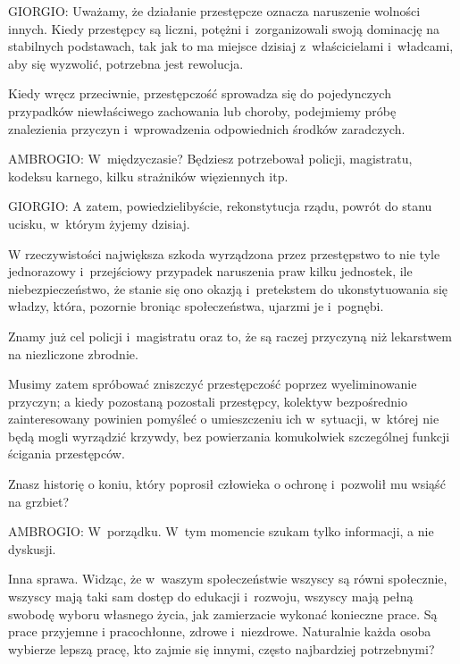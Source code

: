 \documentclass[oneside,polish,11pt,sfheadings]{mwbk}
\begin{document}
 
\noindent GIORGIO: Uważamy, że działanie przestępcze oznacza naruszenie wolności innych. Kiedy przestępcy są liczni, potężni i~zorganizowali swoją dominację na stabilnych podstawach, tak jak to ma miejsce dzisiaj z~właścicielami i~władcami, aby
się wyzwolić, potrzebna jest rewolucja. 

 
Kiedy wręcz przeciwnie, przestępczość sprowadza się do pojedynczych przypadków niewłaściwego zachowania lub choroby,
podejmiemy próbę znalezienia przyczyn i~wprowadzenia odpowiednich środków zaradczych. 




 
\noindent AMBROGIO: W~międzyczasie? Będziesz potrzebował policji, magistratu, kodeksu karnego, kilku strażników więziennych
itp. 




 
\noindent GIORGIO: A zatem, powiedzielibyście, rekonstytucja rządu, powrót do stanu ucisku, w~którym żyjemy dzisiaj. 

 
W rzeczywistości największa szkoda wyrządzona przez przestępstwo to nie tyle jednorazowy i~przejściowy przypadek
naruszenia praw kilku jednostek, ile niebezpieczeństwo, że stanie się ono okazją i~pretekstem do ukonstytuowania się
władzy, która, pozornie broniąc społeczeństwa, ujarzmi je i~pognębi. 

 
Znamy już cel policji i~magistratu oraz to, że są raczej przyczyną niż lekarstwem na niezliczone zbrodnie. 

 
Musimy zatem spróbować zniszczyć przestępczość poprzez wyeliminowanie przyczyn; a kiedy pozostaną pozostali przestępcy,
kolektyw bezpośrednio zainteresowany powinien pomyśleć o umieszczeniu ich w~sytuacji, w~której nie będą mogli wyrządzić
krzywdy, bez powierzania komukolwiek szczególnej funkcji ścigania przestępców. 

 
Znasz historię o koniu, który poprosił człowieka o ochronę i~pozwolił mu wsiąść na grzbiet? 




 
\noindent AMBROGIO: W~porządku. W~tym momencie szukam tylko informacji, a nie dyskusji. 

 
Inna sprawa. Widząc, że w~waszym społeczeństwie wszyscy są równi społecznie, wszyscy mają taki sam dostęp do edukacji i~rozwoju, wszyscy mają pełną swobodę wyboru własnego życia, jak zamierzacie wykonać konieczne prace. Są prace przyjemne
i pracochłonne, zdrowe i~niezdrowe. Naturalnie każda osoba wybierze lepszą pracę, kto zajmie się innymi, często
najbardziej potrzebnymi? 
\end{document}
